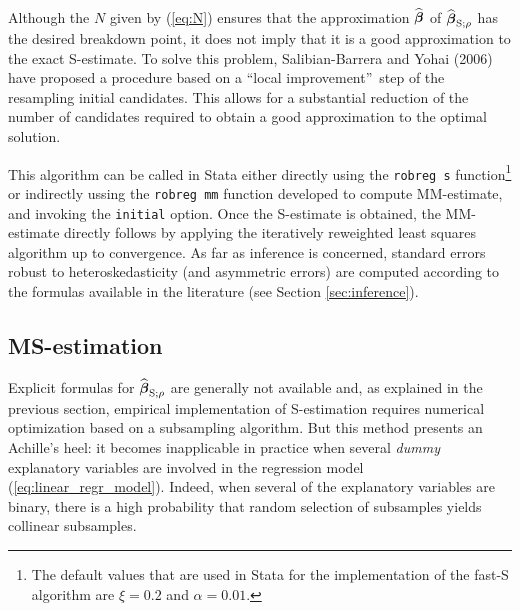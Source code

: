 Although the $N$ given by (\ref{eq:N}) ensures that the approximation
$\widehat{\boldsymbol\beta}$ of $\sthat{\boldsymbol\beta}_{\mathrm{S}%
;\rho}$ has the desired breakdown point, it does not imply that it is a good
approximation to the exact S-estimate. To solve this problem, Salibian-Barrera
and Yohai (2006) have proposed a procedure based on a \textquotedblleft local
improvement\textquotedblright\ step of the resampling initial candidates. This
allows for a substantial reduction of the number of candidates required to
obtain a good approximation to the optimal solution.

This algorithm can be called in Stata either directly using the \texttt{robreg
s} function\footnote{The default values that are used in Stata for the
implementation of the fast-S algorithm are $\xi=0.2$ and $\alpha=0.01$.} or
indirectly ussing the \texttt{robreg mm} function developed to compute
MM-estimate, and invoking the \texttt{initial} option. Once the S-estimate is
obtained, the MM-estimate directly follows by applying the iteratively
reweighted least squares algorithm up to convergence. As far as inference is
concerned, standard errors robust to heteroskedasticity (and asymmetric
errors) are computed according to the formulas available in the literature
(see Section \ref{sec:inference}).

\subsection{MS-estimation}

Explicit formulas for $\widehat{\boldsymbol\beta}_{\mathrm{S};\rho}$ are
generally not available and, as explained in the previous section, empirical
implementation of S-estimation requires numerical optimization based on a
subsampling algorithm. But this method presents an Achille's heel: it becomes
inapplicable in practice when several \emph{dummy} explanatory variables are
involved in the regression model (\ref{eq:linear_regr_model}). Indeed, when
several of the explanatory variables are binary, there is a high probability
that random selection of subsamples yields collinear subsamples.

